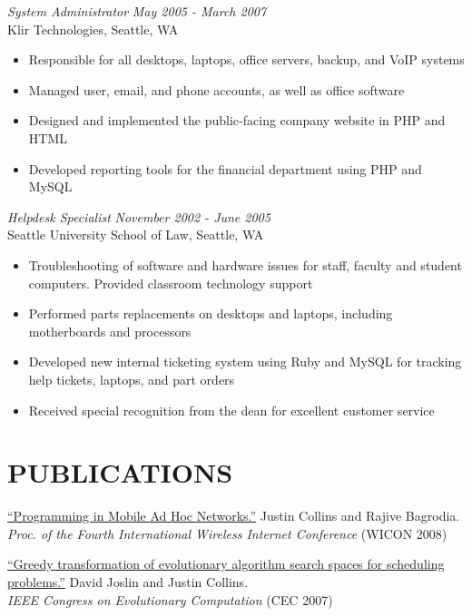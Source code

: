\documentclass[margin]{res}
\begin{document}
\begin{resume}
{\sl System Administrator} \hfill \textit{May 2005 - March 2007} \\
		Klir Technologies, Seattle, WA 
		\begin{itemize}  \itemsep -2pt %
		\item Responsible for all desktops, laptops, office servers, backup, and VoIP systems
		\item Managed user, email, and phone accounts, as well as office software
		\item Designed and implemented the public-facing company website in PHP and HTML
		\item Developed reporting tools for the financial department using PHP and MySQL
		\end{itemize}

{\sl Helpdesk Specialist} \hfill \textit{November 2002 - June 2005} \\
		Seattle University School of Law, Seattle, WA 
		\begin{itemize}  \itemsep -2pt %
		\item Troubleshooting of software and hardware issues for staff, faculty and student computers. Provided classroom technology support
		\item Performed parts replacements on desktops and laptops, including motherboards and processors
		\item Developed new internal ticketing system using Ruby and MySQL for tracking help tickets, laptops, and part orders
		\item Received special recognition from the dean for excellent customer service
		\end{itemize}

		\section{PUBLICATIONS}
		\href{http://cs.ucla.edu/~collins/documents/Justin_Collins-WICON08.pdf}{``Programming in Mobile Ad Hoc Networks.''} Justin Collins and Rajive Bagrodia. \\
{\it Proc. of the Fourth International Wireless Internet Conference} (WICON 2008)

\href{http://cs.ucla.edu/~collins/documents/Joslin_Collins-Greedy_Transformations_of_Search_Spaces.pdf}{``Greedy transformation of evolutionary algorithm search spaces for scheduling problems.''} David Joslin and Justin Collins.\\
{\it IEEE Congress on Evolutionary Computation} (CEC 2007)


\end{resume}
\end{document}
